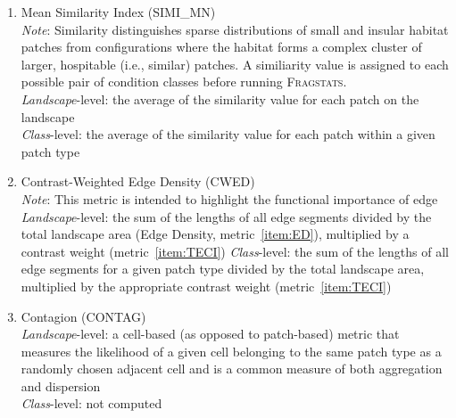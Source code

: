 \begin{itemize}
\begin{enumerate}
		\item Mean Similarity Index (SIMI\_MN)\\
		\emph{Note}: Similarity distinguishes sparse distributions of small and insular habitat patches from configurations where the habitat forms a complex cluster of larger, hospitable (i.e., similar) patches. A similiarity value is assigned to each possible pair of condition classes before running \textsc{Fragstats}. 	\\
		\emph{Landscape}-level: the average of the similarity value for each patch on the landscape \\
		\emph{Class}-level: the average of the similarity value for each patch within a given patch type \\
		
		\item Contrast-Weighted Edge Density (CWED)\\
		\emph{Note}: This metric is intended to highlight the functional importance of edge	\\
		\emph{Landscape}-level: the sum of the lengths of all edge segments divided by the total landscape area (Edge Density, metric~\ref{item:ED}), multiplied by a contrast weight (metric~\ref{item:TECI})
		\emph{Class}-level: the sum of the lengths of all edge segments for a given patch type divided by the total landscape area, multiplied by the appropriate contrast weight (metric~\ref{item:TECI})  	\\

		\item Contagion (CONTAG)\\
		\emph{Landscape}-level: a cell-based (as opposed to patch-based) metric that measures the likelihood of a given cell belonging to the same patch type as a randomly chosen adjacent cell and is a common measure of both aggregation and dispersion 	\\
		\emph{Class}-level: not computed \\ 	
			

\end{enumerate}
\end{itemize}
